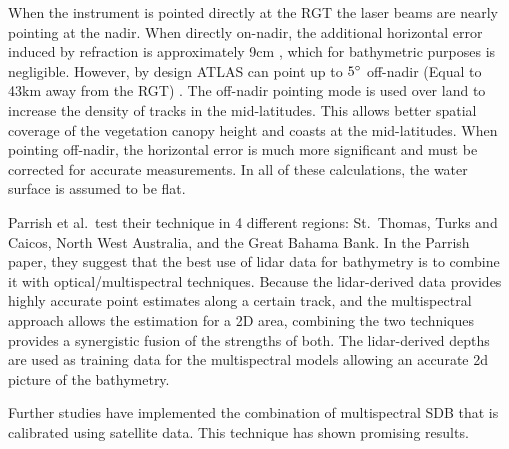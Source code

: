 When the instrument is pointed directly at the RGT the laser beams are nearly pointing at the nadir. When directly on-nadir, the additional horizontal error induced by refraction is approximately 9cm \cite{Parrish2019}, which for bathymetric purposes is negligible. However, by design ATLAS can point up to $5 \degree$ off-nadir (Equal to 43km away from the RGT) \cite{Magruder2021}. The off-nadir pointing mode is used over land to increase the density of tracks in the mid-latitudes. This allows better spatial coverage of the vegetation canopy height and coasts at the mid-latitudes. When pointing off-nadir, the horizontal error is much more significant and must be corrected for accurate measurements. In all of these calculations, the water surface is assumed to be flat.

Parrish et al.~test their technique in 4 different regions: St.~Thomas, Turks and Caicos, North West Australia, and the Great Bahama Bank. In the Parrish paper, they suggest that the best use of lidar data for bathymetry is to combine it with optical/multispectral techniques. Because the lidar-derived data provides highly accurate point estimates along a certain track, and the multispectral approach allows the estimation for a 2D area, combining the two techniques provides a synergistic fusion of the strengths of both. The lidar-derived depths are used as training data for the multispectral models allowing an accurate 2d picture of the bathymetry.

Further studies have implemented the combination of multispectral SDB that is calibrated using satellite data. This technique has shown promising results.

